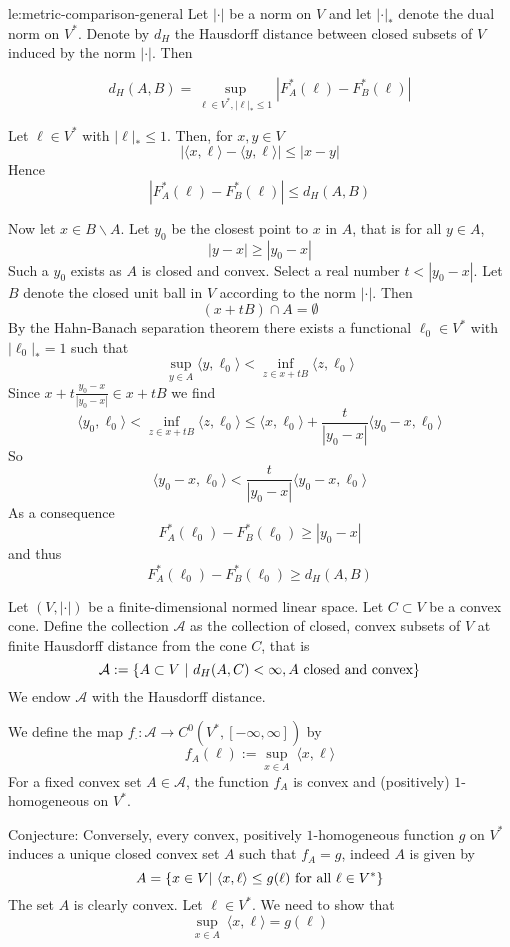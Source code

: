 \documentclass[12pt]{amsart}
\begin{document}
\begin{lemma}{le:metric-comparison-general}
Let $|\cdot|$ be a norm on $V$ and let $|\cdot|_*$ denote the dual norm on $V^*$. Denote by $d_H$ the Hausdorff distance between closed subsets of $V$ induced by the norm $|\cdot|$. Then

\[
d_H(A, B) = \sup_{\ell \in V^*, |\ell|_* \leq 1} | F_A^*(\ell) - F_B^*(\ell) |
\]
\end{lemma}
\begin{Proof}
Let $\ell \in V^*$ with $|\ell|_* \leq 1$. Then, for $x, y \in V$
\[
| \langle x, \ell \rangle - \langle y, \ell \rangle | \leq |x - y|
\]
Hence
\[
|F_A^*(\ell) - F_B^*(\ell) | \leq d_H(A,B)
\]

Now let $x \in B \backslash A$. Let $y_0$ be the closest point to $x$ in $A$, that is for all $y \in A$,
\[
| y - x | \geq | y_0 - x|
\]
Such a $y_0$ exists as $A$ is closed and convex. 
Select a real number $t < |y_0 - x|$. Let $B$ denote the closed unit ball in $V$ according to the norm $|\cdot|$. Then 
\[
(x + t B) \cap A = \emptyset
\]
By the Hahn-Banach separation theorem there exists a functional $\ell_0 \in V^*$ with $|\ell_0|_* = 1$ such that
\[
\sup_{y \in A} \langle y, \ell_0 \rangle < \inf_{z \in x + t B} \langle z, \ell_0 \rangle
\]
Since $x + t \frac{y_0 - x}{|y_0 - x|} \in x + t B$ we find
\[
\langle y_0, \ell_0 \rangle <\inf_{z \in x + t B} \langle z, \ell_0 \rangle \leq \langle x, \ell_0 \rangle + \frac{t}{|y_0 - x|} \langle y_0 - x, \ell_0\rangle
\]
So
\[
\langle y_0 - x , \ell_0 \rangle < \frac{t}{|y_0 - x|} \langle y_0 - x, \ell_0 \rangle
\]
As a consequence
\[
F_A^*(\ell_0) - F_B^*(\ell_0) \geq |y_0 - x|
\]
and thus
\[
F_A^*(\ell_0) - F_B^*(\ell_0 ) \geq d_H(A,B)
\]
\end{Proof}


Let $(V,|\cdot|)$ be a finite-dimensional normed linear space.
Let $C\subset V$ be a convex cone. 
Define the collection $\mathcal{A}$ as the collection of closed, convex subsets of $V$ at finite Hausdorff distance from the cone $C$, that is
\[
\mathcal{A} := \set{ A \subset V \ \middle| \ d_H(A, C) < \infty, A \text{ closed and convex} }
\]
We endow $\mathcal{A}$ with the Hausdorff distance.

We define the map $f_\cdot: \mathcal{A} \to C^0( V^\ast, [-\infty,\infty] )$ by
\[
f_A(\ell) := \sup_{x \in A} \ \langle x, \ell \rangle
\]
For a fixed convex set $A \in \mathcal{A}$, the function $f_A$ is convex and (positively) $1$-homogeneous on $V^*$.

Conjecture: Conversely, every convex, positively $1$-homogeneous function $g$ on $V^*$ induces a unique closed convex set $A$ such that $f_A = g$, indeed $A$ is given by
\[
A = \set{ x \in V \middle|\ \langle x, \ell \rangle \leq g(\ell) \text{ for all } \ell \in V^* }
\]
The set $A$ is clearly convex. Let $\ell \in V^*$. We need to show that
\[
\sup_{x \in A} \ \langle x, \ell \rangle = g(\ell)
\]
\end{document}
